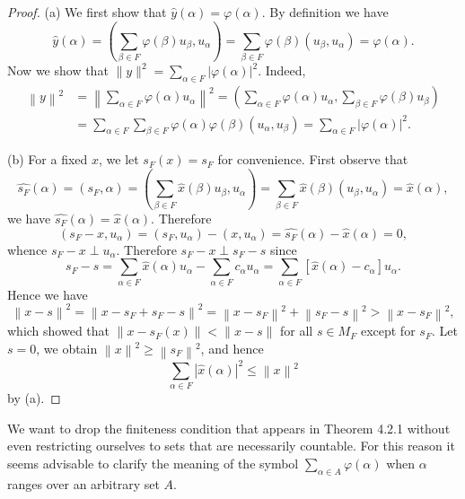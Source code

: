 \begin{proof}
(a) We first show that $\widehat{y}(\alpha)=\varphi(\alpha)$. By definition we have 
$$
\widehat{y}\left( \alpha \right) =\left( \sum_{\beta \in F}{\varphi \left( \beta \right) u_{\beta}},u_{\alpha} \right) =\sum_{\beta \in F}{\varphi \left( \beta \right) \left( u_{\beta},u_{\alpha} \right)}=\varphi \left( \alpha \right) .
$$
Now we show that $\|y\|^2=\sum_{\alpha\in F}|\varphi(\alpha)|^2$. Indeed, 
$$
\begin{aligned}
\left\| y \right\| ^2&=\left\| \sum_{\alpha \in F}{\varphi \left( \alpha \right) u_{\alpha}} \right\| ^2=\left( \sum_{\alpha \in F}{\varphi \left( \alpha \right) u_{\alpha}},\sum_{\beta \in F}{\varphi \left( \beta \right) u_{\beta}} \right) 
\\
&=\sum_{\alpha \in F}{\sum_{\beta \in F}{\varphi \left( \alpha \right) \varphi \left( \beta \right) \left( u_{\alpha},u_{\beta} \right)}}=\sum_{\alpha \in F}{\left| \varphi \left( \alpha \right) \right|^2}.
\end{aligned}
$$\par
(b) For a fixed $x$, we let $s_F(x)=s_F$ for convenience. First observe that 
$$
\widehat{s_F}\left( \alpha \right) =\left( s_F,\alpha \right) =\left( \sum_{\beta \in F}{\widehat{x}\left( \beta \right) u_{\beta}},u_{\alpha} \right) =\sum_{\beta \in F}{\widehat{x}\left( \beta \right) \left( u_{\beta},u_{\alpha} \right)}=\widehat{x}\left( \alpha \right) ,
$$
we have $\widehat{s_F}(\alpha)=\widehat{x}(\alpha)$. Therefore 
$$
\left( s_F-x,u_{\alpha} \right) =\left( s_F,u_{\alpha} \right) -\left( x,u_{\alpha} \right) =\widehat{s_F}\left( \alpha \right) -\widehat{x}\left( \alpha \right) =0,
$$
whence $s_F-x\perp u_\alpha$. Therefore $s_F-x\perp s_F-s$ since 
$$
s_F-s=\sum_{\alpha \in F}{\widehat{x}\left( \alpha \right) u_{\alpha}}-\sum_{\alpha \in F}{c_{\alpha}u_{\alpha}}=\sum_{\alpha \in F}{\left[ \widehat{x}\left( \alpha \right) -c_{\alpha} \right] u_{\alpha}}.
$$
Hence we have 
$$
\left\| x-s \right\| ^2=\left\| x-s_F+s_F-s \right\| ^2=\left\| x-s_F \right\| ^2+\left\| s_F-s \right\| ^2>\left\| x-s_F \right\| ^2,
$$
which showed that $\|x-s_F(x)\|<\|x-s\|$ for all $s\in M_F$ except for $s_F$. Let $s=0$, we obtain $\left\| x \right\| ^2\ge \left\| s_F \right\| ^2$, and hence 
$$
\sum_{\alpha \in F}{\left| \widehat{x}\left( \alpha \right) \right|^2}\le \left\| x \right\| ^2
$$
by (a).
\end{proof}
We want to drop the finiteness condition that appears in Theorem 4.2.1 without even restricting ourselves to sets that are necessarily countable. For this reason it seems advisable to clarify the meaning of the symbol $\sum_{\alpha\in A}\varphi(\alpha)$ when $\alpha$ ranges over an arbitrary set $A$.\par
